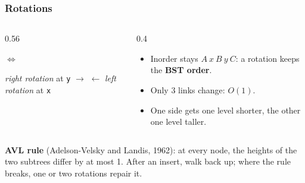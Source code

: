 \documentclass[aspectratio=169,10pt,compress]{beamer}
\begin{document}




\begin{frame}[t,fragile] \frametitle{Rotations}
  \begin{columns}[T]
    \begin{column}{0.56\textwidth}
      \begin{center}
	\quad $\Longleftrightarrow$ \quad
	
      \end{center}
      \small 
		\emph{right rotation} at \texttt{y} $\to$ 
		\quad 
		$\leftarrow$ \emph{left rotation} at \texttt{x}
    \end{column}
    \begin{column}{0.4\textwidth}
      \begin{itemize}\small
        \item Inorder stays $A\ x\ B\ y\ C$: a rotation keeps the \textbf{BST order}.
        \item Only 3 links change: $O(1)$.
        \item One side gets one level shorter, the other one level taller.
      \end{itemize}
    \end{column}
  \end{columns}
  \vspace{0.3em}
  \small \textbf{AVL rule} (Adelson-Velsky and Landis, 1962): at every node, the heights of the two subtrees differ by at most 1.
  After an insert, walk back up; where the rule breaks, one or two rotations repair it.
\end{frame}
\end{document}

